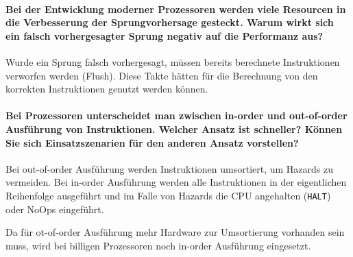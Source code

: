 	\paragraph{Bei der Entwicklung moderner Prozessoren werden viele Resourcen in die Verbesserung der Sprungvorhersage gesteckt. Warum wirkt sich ein falsch vorhergesagter Sprung negativ auf die Performanz aus?}
		Wurde ein Sprung falsch vorhergesagt, müssen bereits berechnete Instruktionen verworfen werden (Flush). Diese Takte hätten für die Berechnung von den korrekten Instruktionen genutzt werden können.

		\paragraph{Bei Prozessoren unterscheidet man zwischen in-order und out-of-order Ausführung von Instruktionen. Welcher Ansatz ist schneller? Können Sie sich Einsatzszenarien für den anderen Ansatz vorstellen?}
			Bei out-of-order Ausführung werden Instruktionen umsortiert, um Hazards zu vermeiden. Bei in-order Ausführung werden alle Instruktionen in der eigentlichen Reihenfolge ausgeführt und im Falle von Hazards die CPU angehalten (\texttt{HALT}) oder NoOps eingeführt.

			Da für ot-of-order Ausführung mehr Hardware zur Umsortierung vorhanden sein muss, wird bei billigen Prozessoren noch in-order Ausführung eingesetzt.
